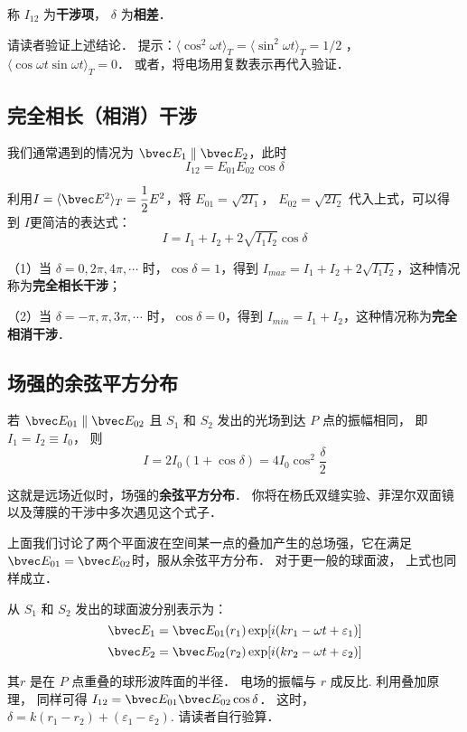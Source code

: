 称 $ I_{12} $ 为\textbf{干涉项}， $ \delta $ 为\textbf{相差}．
\begin{exercise}{}
请读者验证上述结论． 提示：$\langle \cos ^2 \omega t \rangle _T = \langle \sin ^2 \omega t \rangle _T = 1/2 $ ， $ \langle \cos \omega t \sin \omega t \rangle_T =0 $． 或者，将电场用复数表示再代入验证．
\end{exercise}

\subsection{完全相长（相消）干涉}
我们通常遇到的情况为 $\bvec E_1 \parallel \bvec E_2$，此时
$$ I_{12} = E_{01} E_{02}\cos\delta$$

利用$ I = \langle \bvec E^2 \rangle _T = \dfrac{1}{2}E^2$，将 $ E_{ 01} = \sqrt{2I_1}$， $ E_{ 02} = \sqrt{2I_2}$  代入上式，可以得到 $ I $更简洁的表达式：
$$  I = I_1 + I_2 + 2\sqrt{I_1 I_2}\cos\delta$$

（1）当 $\delta = 0, 2\pi, 4\pi, \cdots$ 时，$\cos \delta = 1$，得到 $ I_{max} = I_1 + I_2 +2\sqrt{I_1 I_2}$，这种情况称为\textbf{完全相长干涉}；

（2）当 $\delta = -\pi, \pi, 3\pi, \cdots$ 时，$\cos \delta = 0$，得到 $ I_{min} = I_1 + I_2 $，这种情况称为\textbf{完全相消干涉}．

\subsection{场强的余弦平方分布}

若 $ \bvec E_{01} \parallel \bvec E_{02} $ 且 $S_1$ 和 $S_2$ 发出的光场到达 $ P $ 点的振幅相同， 即 $ I_1 = I_2 \equiv I_0 $， 则
$$ I = 2 I_0 ( 1 + \cos\delta ) = 4 I_0 \cos ^2\dfrac { \delta } { 2 } $$

这就是远场近似时，场强的\textbf{余弦平方分布}． 你将在杨氏双缝实验、菲涅尔双面镜以及薄膜的干涉中多次遇见这个式子．

上面我们讨论了两个平面波在空间某一点的叠加产生的总场强，它在满足 $ \bvec E_{01} = \bvec E_{02}$时，服从余弦平方分布． 对于更一般的球面波， 上式也同样成立． 

从 $ S_1 $ 和 $ S_2 $ 发出的球面波分别表示为：
$$ \bvec E_1 = \bvec E_{ 01 } ( r_1 ) \exp[ i( k r_1 - \omega t+ \varepsilon_1 )]$$
$$ \bvec E_2 = \bvec E_{ 02 } ( r_2 ) \exp[ i( k r_2 - \omega t+ \varepsilon_2 )]$$

其$ r $ 是在 $ P $ 点重叠的球形波阵面的半径． 电场的振幅与 $ r $ 成反比. 利用叠加原理， 同样可得 $I_{12} = \bvec E_{01}\bvec E_{02} \cos\delta$． 这时， $ \delta = k ( r_1 - r_2 ) + ( \varepsilon_1 - \varepsilon_2 )$.  请读者自行验算．

